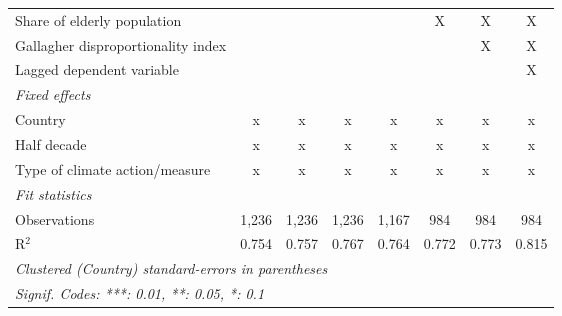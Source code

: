\begin{tabular}{lccccccc}
   Share of elderly population                                                               &         &         &              &         & X            & X            & X\\  
   Gallagher disproportionality index                                                        &         &         &              &         &              & X            & X\\  
   Lagged dependent variable                                                                 &         &         &              &         &              &              & X\\  
   \emph{Fixed effects}\\
   Country                                                                                   & x       & x       & x            & x       & x            & x            & x\\  
   Half decade                                                                               & x       & x       & x            & x       & x            & x            & x\\  
   Type of climate action/measure                                                            & x       & x       & x            & x       & x            & x            & x\\  
   \midrule \emph{Fit statistics}\\
   Observations                                                                              & 1,236   & 1,236   & 1,236        & 1,167   & 984          & 984          & 984\\  
   R$^2$                                                                                     & 0.754   & 0.757   & 0.767        & 0.764   & 0.772        & 0.773        & 0.815\\  
   \midrule
   \multicolumn{8}{l}{\emph{Clustered (Country) standard-errors in parentheses}}\\
   \multicolumn{8}{l}{\emph{Signif. Codes: ***: 0.01, **: 0.05, *: 0.1}}\\
\end{tabular}
\par\endgroup


